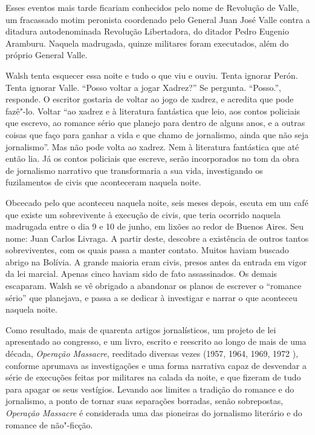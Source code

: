 Esses eventos mais tarde ficariam conhecidos pelo nome de Revolução de
Valle, um fracassado motim peronista coordenado pelo General Juan José
Valle contra a ditadura autodenominada Revolução Libertadora, do ditador
Pedro Eugenio Aramburu. Naquela madrugada, quinze militares foram
executados, além do próprio General Valle.

Walsh tenta esquecer essa noite e tudo o que viu e ouviu. Tenta ignorar
Perón. Tenta ignorar Valle. ``Posso voltar a jogar Xadrez?'' Se
pergunta. ``Posso.'', responde. O escritor gostaria de voltar ao jogo de
xadrez, e acredita que pode fazê"-lo. Voltar ``ao xadrez e à literatura
fantástica que leio, aos contos policiais que escrevo, ao romance sério
que planejo para dentro de alguns anos, e a outras coisas que faço para
ganhar a vida e que chamo de jornalismo, ainda que não seja
jornalismo''. Mas não pode volta ao xadrez. Nem à literatura fantástica
que até então lia. Já os contos policiais que escreve, serão
incorporados no tom da obra de jornalismo narrativo que transformaria a
sua vida, investigando os fuzilamentos de civis que aconteceram naquela
noite.

Obcecado pelo que aconteceu naquela noite, seis meses depois, escuta em
um café que existe um sobrevivente à execução de civis, que teria
ocorrido naquela madrugada entre o dia 9 e 10 de junho, em lixões ao
redor de Buenos Aires. Seu nome: Juan Carlos Livraga. A partir deste,
descobre a existência de outros tantos sobreviventes, com os quais passa
a manter contato. Muitos haviam buscado abrigo na Bolívia. A grande
maioria eram civis, presos antes da entrada em vigor da lei marcial.
Apenas cinco haviam sido de fato assassinados. Os demais escaparam.
Walsh se vê obrigado a abandonar os planos de escrever o ``romance
sério'' que planejava, e passa a se dedicar à investigar e narrar o que
aconteceu naquela noite.

Como resultado, mais de quarenta artigos jornalísticos, um projeto de
lei apresentado ao congresso, e um livro, escrito e reescrito ao longo
de mais de uma década, \emph{Operação Massacre}, reeditado diversas
vezes (1957, 1964, 1969, 1972 ), conforme aprumava as investigações e
uma forma narrativa capaz de desvendar a série de execuções feitas por
militares na calada da noite, e que fizeram de tudo para apagar os seus
vestígios. Levando aos limites a tradição do romance e do jornalismo, a
ponto de tornar suas separações borradas, senão sobrepostas,
\emph{Operação Massacre} é considerada uma das pioneiras do jornalismo
literário e do romance de não"-ficção.


